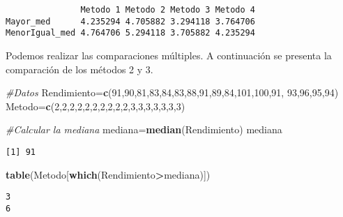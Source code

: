 \documentclass[
  a4paper,
  oneside,
  openany]{book}
\newenvironment{Shaded}{\begin{snugshade}}{\end{snugshade}}
\newcommand{\CommentTok}[1]{\textcolor[rgb]{0.56,0.35,0.01}{\textit{#1}}}
\newcommand{\DecValTok}[1]{\textcolor[rgb]{0.00,0.00,0.81}{#1}}
\newcommand{\KeywordTok}[1]{\textcolor[rgb]{0.13,0.29,0.53}{\textbf{#1}}}
\newcommand{\NormalTok}[1]{#1}
\newcommand{\OperatorTok}[1]{\textcolor[rgb]{0.81,0.36,0.00}{\textbf{#1}}}
\begin{document}
\begin{verbatim}
               Metodo 1 Metodo 2 Metodo 3 Metodo 4
Mayor_med      4.235294 4.705882 3.294118 3.764706
MenorIgual_med 4.764706 5.294118 3.705882 4.235294
\end{verbatim}

Podemos realizar las comparaciones múltiples. A continuación se presenta la comparación de los métodos 2 y 3.

\begin{Shaded}
\begin{Highlighting}[]
\CommentTok{\#Datos}
\NormalTok{Rendimiento=}\KeywordTok{c}\NormalTok{(}\DecValTok{91}\NormalTok{,}\DecValTok{90}\NormalTok{,}\DecValTok{81}\NormalTok{,}\DecValTok{83}\NormalTok{,}\DecValTok{84}\NormalTok{,}\DecValTok{83}\NormalTok{,}\DecValTok{88}\NormalTok{,}\DecValTok{91}\NormalTok{,}\DecValTok{89}\NormalTok{,}\DecValTok{84}\NormalTok{,}\DecValTok{101}\NormalTok{,}\DecValTok{100}\NormalTok{,}\DecValTok{91}\NormalTok{,}
              \DecValTok{93}\NormalTok{,}\DecValTok{96}\NormalTok{,}\DecValTok{95}\NormalTok{,}\DecValTok{94}\NormalTok{)}
\NormalTok{Metodo=}\KeywordTok{c}\NormalTok{(}\DecValTok{2}\NormalTok{,}\DecValTok{2}\NormalTok{,}\DecValTok{2}\NormalTok{,}\DecValTok{2}\NormalTok{,}\DecValTok{2}\NormalTok{,}\DecValTok{2}\NormalTok{,}\DecValTok{2}\NormalTok{,}\DecValTok{2}\NormalTok{,}\DecValTok{2}\NormalTok{,}\DecValTok{2}\NormalTok{,}\DecValTok{3}\NormalTok{,}\DecValTok{3}\NormalTok{,}\DecValTok{3}\NormalTok{,}\DecValTok{3}\NormalTok{,}\DecValTok{3}\NormalTok{,}\DecValTok{3}\NormalTok{,}\DecValTok{3}\NormalTok{)}

\CommentTok{\#Calcular la mediana}
\NormalTok{mediana=}\KeywordTok{median}\NormalTok{(Rendimiento)}
\NormalTok{mediana}
\end{Highlighting}
\end{Shaded}

\begin{verbatim}
[1] 91
\end{verbatim}

\begin{Shaded}
\begin{Highlighting}[]
\KeywordTok{table}\NormalTok{(Metodo[}\KeywordTok{which}\NormalTok{(Rendimiento}\OperatorTok{\textgreater{}}\NormalTok{mediana)])}
\end{Highlighting}
\end{Shaded}

\begin{verbatim}
3 
6 
\end{verbatim}
\end{document}
